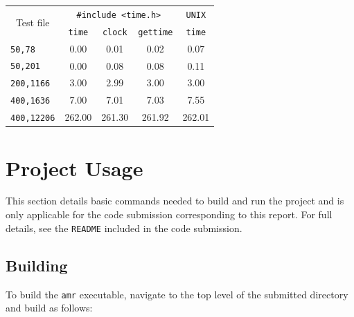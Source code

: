 \documentclass{article}
\begin{document}
\begin{minipage}{\linewidth}
\begin{minipage}{0.4\linewidth}
    \end{minipage}
    \hspace{0.02\linewidth}
    \begin{minipage}{0.45\linewidth}
        \centering
        \begin{tabular}{|l|c|c|c|c|}
            \hline
            \multicolumn{1}{|c|}{\multirow{2}{*}{Test file}} & \multicolumn{3}{|c|}{\texttt{\#include <time.h>}} & \texttt{UNIX} \\
            \cline{2-5}
            \multicolumn{1}{|c|}{} & \texttt{time} & \texttt{clock} & \texttt{gettime} & \texttt{time} \\
            \hline
            \hline
            \texttt{50,78}     & 0.00 & 0.01 & 0.02 & 0.07 \\
            \texttt{50,201}    & 0.00 & 0.08 & 0.08 & 0.11 \\
            \texttt{200,1166}  & 3.00 & 2.99 & 3.00 & 3.00 \\
            \texttt{400,1636}  & 7.00 & 7.01 & 7.03 & 7.55 \\
            \texttt{400,12206} & 262.00 & 261.30 & 261.92 & 262.01 \\
            \hline
        \end{tabular}

        \label{tab:runtime}

    \end{minipage}
\end{minipage}

\section*{Project Usage}
\label{sec:project}

This section details basic commands needed to build and run the project and is
only applicable for the code submission corresponding to this report. For full
details, see the \texttt{README} included in the code submission.

\subsection*{Building}
\label{subsec:building}

To build the \texttt{amr} executable, navigate to the top level of the
submitted directory and build as follows:
\end{document}
